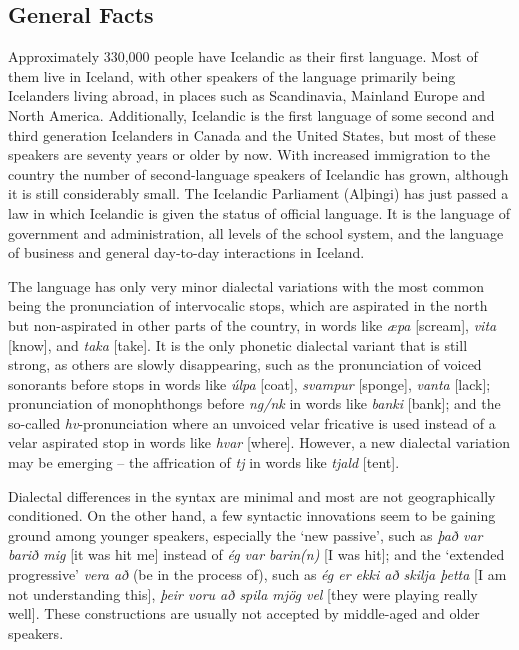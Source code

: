 \documentclass{../../metanetpaper}
\begin{document}
\begin{multicols}{2}

\subsection{General Facts}

Approximately 330,000 people have Icelandic as their first language. Most of them live in Iceland\cite{hag1},  with other speakers of the language primarily being Icelanders living abroad\cite{vis1},  in places such as Scandinavia, Mainland Europe and North America. Additionally, Icelandic is the first language of some second and third generation Icelanders in Canada and the United States\cite{can1},  but most of these speakers are seventy years or older by now. With increased immigration to the country the number of second-language speakers of Icelandic has grown, although it is still considerably small. 
The Icelandic Parliament (Alþingi) has just passed a law in which Icelandic is given the status of official language\cite{alt1}.  It is the language of government and administration, all levels of the school system, and the language of business and general day-to-day interactions in Iceland.

The language has only very minor dialectal variations with the most common being the pronunciation of intervocalic stops, which are aspirated in the north but non-aspirated in other parts of the country, in words like \textit{æpa} {[}scream{]}, \textit{vita} {[}know{]}, and \textit{taka} {[}take{]}. It is the only phonetic dialectal variant that is still strong, as others are slowly disappearing, such as the pronunciation of voiced sonorants before stops in words like \textit{úlpa} {[}coat{]}, \textit{svampur} {[}sponge{]}, \textit{vanta} {[}lack{]}; pronunciation of monophthongs before \textit{ng/nk} in words like \textit{banki} {[}bank{]}; and the so-called \textit{hv}-pronunciation where an unvoiced velar fricative is used instead of a velar aspirated stop in words like \textit{hvar} {[}where{]}\cite{mal1}.  However, a new dialectal variation may be emerging -- the affrication of \textit{tj} in words like \textit{tjald} {[}tent{]}\cite{tvi1}. 

Dialectal differences in the syntax are minimal and most are not geographically conditioned. On the other hand, a few syntactic innovations seem to be gaining ground among younger speakers, especially the ‘new passive’, such as \textit{það var barið mig} {[}it was hit me{]} instead of \textit{ég var barin(n)} {[}I was hit{]}; and the ‘extended progressive’ \textit{vera að} (be in the process of), such as \textit{ég er ekki að skilja þetta} {[}I am not understanding this{]}, \textit{þeir voru að spila mjög vel} {[}they were playing really well{]}. These constructions are usually not accepted by middle-aged and older speakers.


\end{multicols}
\end{document}

